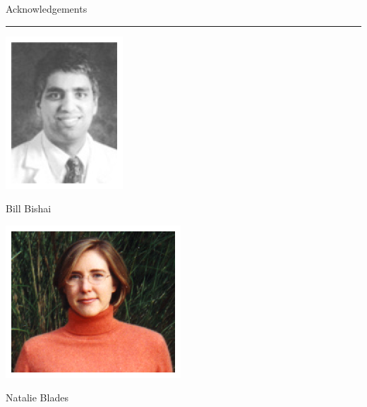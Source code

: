 \documentclass[12pt]{article}
\newcommand{\headsize}{\fontsize{35}{35} \selectfont}
\newcommand{\smallsize}{\fontsize{25}{30} \selectfont}
\newcommand{\headcolor}{\color [cmyk]{0.72,0.67,0.33,0}}
\newcommand{\linecolor}{\color [named]{Thistle}}
\begin{document}
\newpage

\headsize \headcolor
\centerline{Acknowledgements}
\linecolor \noindent \rule[3mm]{10in}{2mm}

\vspace*{15mm}

\normalcolor \smallsize 

\begin{center}
\begin{minipage}[t]{2.5in}
\vspace*{0mm}

\begin{center}
\includegraphics[scale=2.3]{Figs/Bishai.ps}

Bill Bishai
\end{center} \end{minipage}
\hspace{0.25in}
\begin{minipage}[t]{2.7in}
\vspace*{0mm}

\begin{center}
\includegraphics[scale=2.3]{Figs/natalie.ps}

Natalie Blades
\end{center} \end{minipage}
\hspace{0.7in}
\begin{minipage}[t]{3in}
\vspace*{0mm}


\end{minipage}
\end{center}
\end{document}
